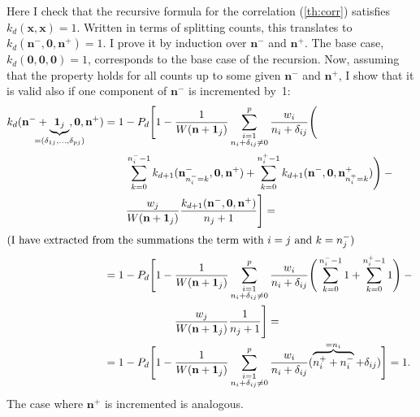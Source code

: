 \documentclass[a4paper]{article}
\theoremstyle{definition}
\begin{document}
    Here I check that the recursive formula for the correlation (\autoref{th:corr}) satisfies $k_d(\mathbf x, \mathbf x) = 1$. Written in terms of splitting counts, this translates to $k_d(\mathbf n^-, \mathbf 0, \mathbf n^+) = 1$. I prove it by induction over $\mathbf n^-$ and $\mathbf n^+$. The base case, $k_d(\mathbf 0, \mathbf 0, \mathbf 0) = 1$, corresponds to the base case of the recursion. Now, assuming that the property holds for all counts up to some given $\mathbf n^-$ and $\mathbf n^+$, I show that it is valid also if one component of $\mathbf n^-$ is incremented by~1:
    \begin{align}
        k_d(\mathbf n^- + \underbrace{\mathbf 1_j}
            _{\mathclap{{}=(\delta_{1j}, \ldots, \delta_{pj})}},
        \mathbf 0, \mathbf n^+)
        &= 1 - P_d \Bigg[1 - \frac1{W(\mathbf n + \mathbf 1_j)}
            \sum_{\substack{i=1 \\ n_i + \delta_{ij}\ne 0}}^p
            \frac{w_i}{n_i + \delta_{ij}} \Bigg( \notag \\
                &\qquad \sum_{k=0}^{n^-_i - 1}
                k_{d+1}(\mathbf n^-_{n^-_i=k}, \mathbf 0, \mathbf n^+)
                + \sum_{k=0}^{n^+_i - 1}
                k_{d+1}(\mathbf n^-, \mathbf 0, \mathbf n^+_{n^+_i=k})
            \Bigg) - {} \notag \\
                &\qquad \frac{w_j}{W(\mathbf n + \mathbf 1_j)}
                \frac{k_{d+1}(\mathbf n^-, \mathbf 0, \mathbf n^+)}{n_j + 1}
        \Bigg] = \notag \\
        \intertext{(I have extracted from the summations the term with $i = j$
        and $k = n^-_j$)}
        &= 1 - P_d \Bigg[1 - \frac1{W(\mathbf n + \mathbf 1_j)}
            \sum_{\substack{i=1 \\ n_i + \delta_{ij}\ne 0}}^p
            \frac{w_i}{n_i + \delta_{ij}} \Bigg(
                \sum_{k=0}^{n^-_i - 1} 1 + \sum_{k=0}^{n^+_i - 1} 1
            \Bigg) - {} \notag \\
                &\phantom{{}= 1 - P_d \Bigg[1 - {}}
                \frac{w_j}{W(\mathbf n + \mathbf 1_j)} \frac1{n_j + 1}
        \Bigg] = \notag \\
        &= 1 - P_d \Bigg[1 - \frac1{W(\mathbf n + \mathbf 1_j)}
            \sum_{\substack{i=1 \\ n_i + \delta_{ij}\ne 0}}^p
            \frac{w_i}{n_i + \delta_{ij}} (\overbrace{n^+_i + n^-_i}^{{}=n_i} + \delta_{ij})
        \Bigg] = 1.
    \end{align}
    The case where $\mathbf n^+$ is incremented is analogous.
\end{document}
